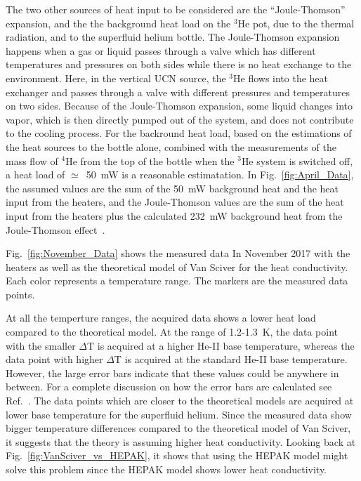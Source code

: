The two other sources of heat input to be considered are the
``Joule-Thomson'' expansion, and the the background heat load on the
$^3$He pot, due to the thermal radiation, and to the superfluid helium
bottle. The Joule-Thomson expansion happens when a gas or liquid
passes through a valve which has different temperatures and pressures
on both sides while there is no heat exchange to the
environment. Here, in the vertical UCN source, the $^3$He flows into
the heat exchanger and passes through a valve with different pressures
and temperatures on two sides. Because of the Joule-Thomson expansion,
some liquid changes into vapor, which is then directly pumped out of
the system, and does not contribute to the cooling process.  For the
backround heat load, based on the estimations of the heat sources to
the bottle alone, combined with the measurements of the mass flow of
$^4$He from the top of the bottle when the $^3$He system is switched
off, a heat load of $\simeq$~50~mW is a reasonable estimatation. In
Fig.~\ref{fig:April_Data}, the assumed values are the sum of the 50~mW
background heat and the heat input from the heaters, and the
Joule-Thomson values are the sum of the heat input from the heaters
plus the calculated 232~mW background heat from the Joule-Thomson
effect~\cite{Florian_thesis}.



Fig.~\ref{fig:November_Data} shows the measured data In November 2017
with the heaters as well as the theoretical model of Van Sciver for
the heat conductivity. Each color represents a temperature range. The
markers are the measured data points.

At all the temperture ranges, the acquired data shows a lower heat
load compared to the theoretical model. At the range of 1.2-1.3~K, the
data point with the smaller $\Delta$T is acquired at a higher He-II
base temperature, whereas the data point with higher $\Delta$T is
acquired at the standard He-II base temperature. However, the large
error bars indicate that these values could be anywhere in
between. For a complete discussion on how the error bars are
calculated see Ref.~\cite{Florian_thesis}. The data points which are
closer to the theoretical models are acquired at lower base
temperature for the superfluid helium. Since the measured data show
bigger temperature differences compared to the theoretical model of
Van Sciver, it suggests that the theory is assuming higher heat
conductivity. Looking back at Fig.~\ref{fig:VanSciver_vs_HEPAK}, it
shows that using the HEPAK model might solve this problem since the
HEPAK model shows lower heat conductivity.

